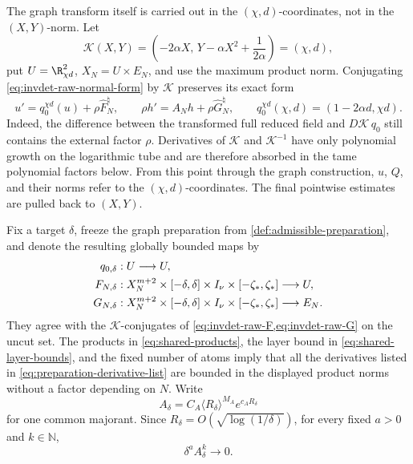 The graph transform itself is carried out in the \((\chi,d)\)-coordinates,
not in the \((X,Y)\)-norm.  Let
\[
 \mathcal K(X,Y)=
 \left(-2\alpha X,\,
       Y-\alpha X^2+\frac1{2\alpha}\right)=(\chi,d),
\]
put \(U=\R^2_{\chi d}\), \(X_N=U\times E_N\), and use the maximum product
norm.  Conjugating \cref{eq:invdet-raw-normal-form} by \(\mathcal K\)
preserves its exact form
\[
 u'=q_0^{\chi d}(u)+\rho\widehat F_N^\natural,\qquad
 \rho h'=A_Nh+\rho\widehat G_N^\natural,
 \qquad
 q_0^{\chi d}(\chi,d)=(1-2\alpha d,\chi d).
\]
Indeed, the difference between the transformed full reduced field and
\(D\mathcal K\,q_0\) still contains the external factor \(\rho\).
Derivatives of \(\mathcal K\) and \(\mathcal K^{-1}\) have only polynomial
growth on the logarithmic tube and are therefore absorbed in the tame
polynomial factors below.  From this point through the graph construction,
\(u\), \(Q\), and their norms refer to the \((\chi,d)\)-coordinates.
The final pointwise estimates are pulled back to \((X,Y)\).

Fix a target \(\delta\), freeze the graph preparation from
\cref{def:admissible-preparation}, and denote the resulting globally bounded
maps by
\begin{align}
 q_{0,\delta}&:U\longrightarrow U,\notag\\
 F_{N,\delta}&:X_N^{m+2}\times[-\delta,\delta]
          \times I_\nu\times[-\zeta_*,\zeta_*]\longrightarrow U,\notag\\
 G_{N,\delta}&:X_N^{m+2}\times[-\delta,\delta]
          \times I_\nu\times[-\zeta_*,\zeta_*]\longrightarrow E_N.
                                                               \label{eq:invdet-prepared-data}
\end{align}
They agree with the \(\mathcal K\)-conjugates of
\cref{eq:invdet-raw-F,eq:invdet-raw-G} on the uncut set.
The products in \cref{eq:shared-products}, the layer bound in
\cref{eq:shared-layer-bounds}, and the fixed number of atoms imply that all
the derivatives listed in \cref{eq:preparation-derivative-list} are bounded
in the displayed product norms without a factor depending on \(N\).  Write
\begin{equation}
 A_\delta=C_A\langle R_\delta\rangle^{M_A}e^{c_AR_\delta}          \label{eq:invdet-prepared-majorant}
\end{equation}
for one common majorant.  Since
\(R_\delta=O(\sqrt{\log(1/\delta)})\), for every fixed \(a>0\) and
\(k\in\mathbb N\),
\begin{equation}
 \delta^a A_\delta^k\longrightarrow0.                           \label{eq:invdet-subpower}
\end{equation}

